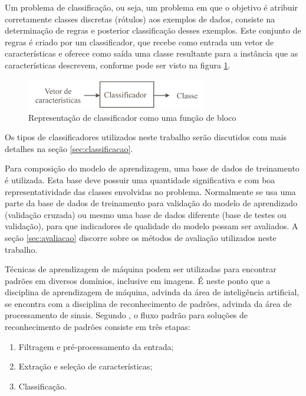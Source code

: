 Um problema de classificação, ou seja, um problema em que o objetivo é atribuir corretamente classes discretas (rótulos) aos exemplos de dados, consiste na determinação de regras e posterior classificação desses exemplos. Este conjunto de regras é criado por um classificador, que recebe como entrada um vetor de características e oferece como saída uma classe resultante para a instância que as características descrevem, conforme pode ser visto na figura \ref{fig:classificador}.

\begin{figure}[h!]
  \centering
  \includegraphics[width=0.7\textwidth]{imgs/classificador}
  \caption{Representação de classificador como uma função de bloco}
  \label{fig:classificador}
\end{figure}

Os tipos de classificadores utilizados neste trabalho serão discutidos com mais detalhes na seção \ref{sec:classificacao}.

Para composição do modelo de aprendizagem, uma base de dados de treinamento é utilizada. Esta base deve possuir uma quantidade significativa e com boa representatividade das classes envolvidas no problema. Normalmente se usa uma parte da base de dados de treinamento para validação do modelo de aprendizado (validação cruzada) ou mesmo uma base de dados diferente (base de testes ou validação), para que indicadores de qualidade do modelo possam ser avaliados. A seção \ref{sec:avaliacao} discorre sobre os métodos de avaliação utilizados neste trabalho.

Técnicas de aprendizagem de máquina podem ser utilizadas para encontrar padrões em diversos domínios, inclusive em imagens. É neste ponto que a disciplina de aprendizagem de máquina, advinda da área de inteligência artificial, se encontra com a disciplina de reconhecimento de padrões, advinda da área de processamento de sinais. Segundo \cite{jain:1989}, o fluxo padrão para soluções de reconhecimento de padrões consiste em três etapas:

\begin{enumerate}
    \item Filtragem e pré-processamento da entrada;
    \item Extração e seleção de características;
    \item Classificação.
\end{enumerate}

